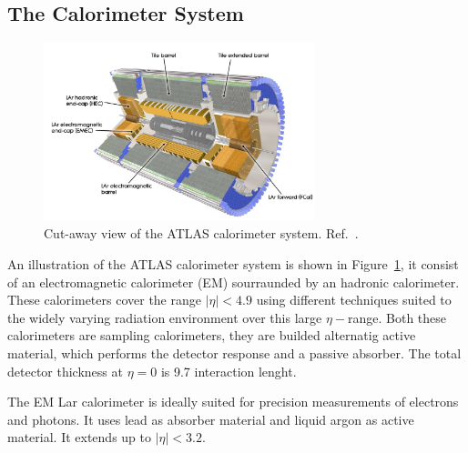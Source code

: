 \subsection{The Calorimeter System}

\begin{figure}[tp]
     \begin{center}

            \includegraphics[width=0.7\textwidth]{figure/Calo.png}

    \end{center}
    \caption{Cut-away view of the ATLAS calorimeter system. Ref.~\cite{ATLASDetector}.}



   \label{fig:atlasCal}
\end{figure}

An illustration of the ATLAS calorimeter system is shown in Figure~\ref{fig:atlasCal}, it consist of an electromagnetic calorimeter (EM) sourraunded by an hadronic 
calorimeter.  These calorimeters cover the range $|\eta| < 4.9$ using different techniques suited to the
widely varying  radiation environment over this large $\eta-$range. Both these calorimeters are sampling calorimeters, they are builded alternatig
active material, which performs the detector response and a passive absorber.
The total detector thickness at $\eta = 0$ is 9.7 interaction lenght. 

The EM Lar calorimeter is ideally suited for precision measurements of electrons and photons.  It uses lead as absorber material and liquid argon 
as active material. It extends up to $|\eta| < 3.2$.

